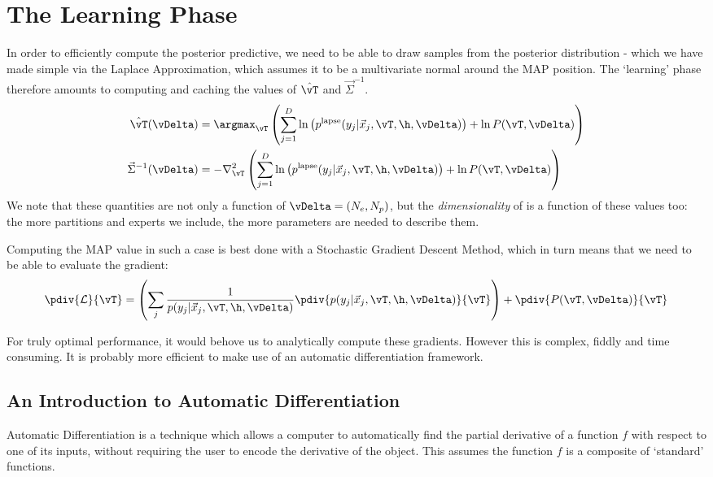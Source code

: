 
    \section{The Learning Phase}

        In order to efficiently compute the posterior predictive, we need to be able to draw samples from the posterior distribution - which we have made simple via the Laplace Approximation, which assumes it to be a multivariate normal around the MAP position. The `learning' phase therefore amounts to computing and caching the values of $\hat{\vT}$ and $\vec{\Sigma}^{-1}$.
        \begin{align}
            \hat{\vT}(\vDelta) & = \argmax_\vT \left( \sum_{j=1}^D \ln\left(p^\text{lapse}(y_j|\vec{x}_j,\vT,\h,\vDelta)\right) + \ln P(\vT,\vDelta)\right)
            \\
            \vec{\Sigma}^{-1}(\vDelta) & = - \nabla_{\vT}^2\left( \sum_{j=1}^D \ln\left(p^\text{lapse}(y_j|\vec{x}_j,\vT,\h,\vDelta)\right) + \ln P(\vT,\vDelta)\right)
        \end{align}
        We note that these quantities are not only a function of $\vDelta = (N_e, N_p)$, but the \textit{dimensionality} of is a function of these values too: the more partitions and experts we include, the more parameters are needed to describe them. 

        Computing the MAP value in such a case is best done with a Stochastic Gradient Descent Method, which in turn means that we need to be able to evaluate the gradient:
        \begin{equation}
            \pdiv{\mathcal{L}}{\vT} = \left(\sum_j \frac{1}{p(y_j | \vec{x}_j, \vT,\h,\vDelta)} \pdiv{p(y_j| \vec{x}_j, \vT,\h,\vDelta)}{\vT} \right) + \pdiv{P(\vT,\vDelta)}{\vT}
        \end{equation}

        For truly optimal performance, it would behove us to analytically compute these gradients. However this is complex, fiddly and time consuming. It is probably more efficient to make use of an automatic differentiation framework. 
        
        \subsection{An Introduction to Automatic Differentiation}

            Automatic Differentiation is a technique which allows a computer to automatically find the partial derivative of a function $f$ with respect to one of its inputs, without requiring the user to encode the derivative of the object. This assumes the function $f$ is a composite of `standard' functions.  

